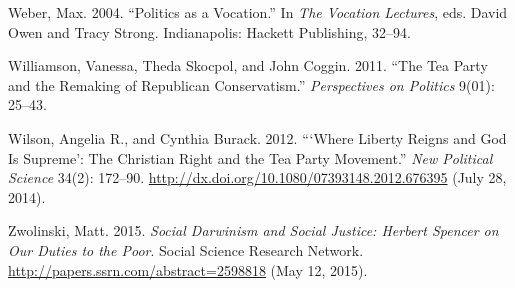 \documentclass[12pt,]{article}
\begin{document}
Weber, Max. 2004. ``Politics as a Vocation.'' In \emph{The Vocation
Lectures}, eds. David Owen and Tracy Strong. Indianapolis: Hackett
Publishing, 32--94.

Williamson, Vanessa, Theda Skocpol, and John Coggin. 2011. ``The Tea
Party and the Remaking of Republican Conservatism.'' \emph{Perspectives
on Politics} 9(01): 25--43.

Wilson, Angelia R., and Cynthia Burack. 2012. ```Where Liberty Reigns
and God Is Supreme': The Christian Right and the Tea Party Movement.''
\emph{New Political Science} 34(2): 172--90.
\url{http://dx.doi.org/10.1080/07393148.2012.676395} (July 28, 2014).

Zwolinski, Matt. 2015. \emph{Social Darwinism and Social Justice:
Herbert Spencer on Our Duties to the Poor}. Social Science Research
Network. \url{http://papers.ssrn.com/abstract=2598818} (May 12, 2015).
\end{document}
